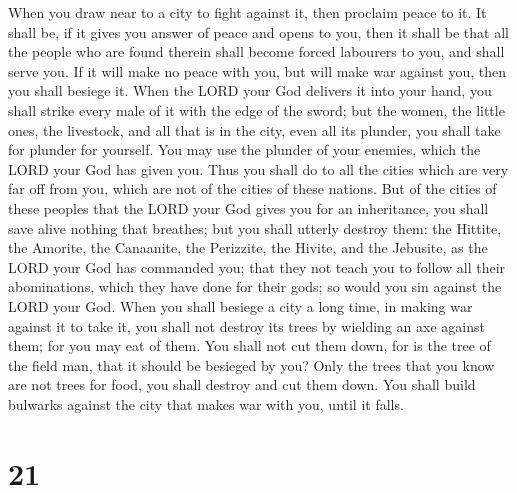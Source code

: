  When you draw near to a city to fight against it, then
proclaim peace to it.  It shall be, if it gives you
answer of peace and opens to you, then it shall be that all the people
who are found therein shall become forced labourers to you, and shall
serve you.  If it will make no peace with you, but will
make war against you, then you shall besiege it.  When
the LORD your God delivers it into your hand, you shall strike every
male of it with the edge of the sword;  but the women,
the little ones, the livestock, and all that is in the city, even all
its plunder, you shall take for plunder for yourself. You may use the
plunder of your enemies, which the LORD your God has given you.
 Thus you shall do to all the cities which are very far
off from you, which are not of the cities of these nations.
 But of the cities of these peoples that the LORD your
God gives you for an inheritance, you shall save alive nothing that
breathes;  but you shall utterly destroy them: the
Hittite, the Amorite, the Canaanite, the Perizzite, the Hivite, and the
Jebusite, as the LORD your God has commanded you;  that
they not teach you to follow all their abominations, which they have
done for their gods; so would you sin against the LORD your God.
 When you shall besiege a city a long time, in making war
against it to take it, you shall not destroy its trees by wielding an
axe against them; for you may eat of them. You shall not cut them down,
for is the tree of the field man, that it should be besieged by you?
 Only the trees that you know are not trees for food, you
shall destroy and cut them down. You shall build bulwarks against the
city that makes war with you, until it falls.

\hypertarget{section-20}{%
\section{21}\label{section-20}}

